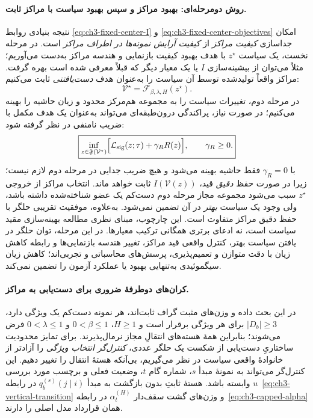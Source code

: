 \paragraph{روش دومرحله‌ای: بهبود مراکز و سپس بهبود سیاست با مراکز ثابت.}
نتیجه بنیادی روابط
\eqref{eq:ch3-fixed-center-I}
و \eqref{eq:ch3-fixed-center-objectives}
امکان جداسازی
\emph{کیفیت مراکز}
از \emph{کیفیت آرایش
نمونه‌ها در اطراف
مراکز} است.
در مرحله نخست،
یک سیاست $z^\star$
با هدف بهبود کیفیت
بازنمایی و هندسه مراکز
به‌دست می‌آوریم؛
مثلاً می‌توان از
بیشینه‌سازی $I$
یا یک معیار دیگر
که قبلاً معرفی شده
است بهره گرفت.
مراکز واقعاً
تولیدشده توسط آن
سیاست را به‌عنوان
هدف \emph{دست‌یافتنی}
ثابت می‌کنیم:
\[
\mathcal V^\star
=\mathcal F_{\beta,\lambda,H}(z^\star).
\]
در مرحله دوم،
تغییرات سیاست را
به مجموعه هم‌مرکز
محدود و زیان حاشیه
را بهینه می‌کنیم؛
در صورت نیاز،
پراکندگی درون‌طبقه‌ای
می‌تواند به‌عنوان
یک هدف مکمل
با ضریب نامنفی
در نظر گرفته شود:
\begin{equation}\label{eq:ch3-two-stage-fixed-center-optimization}
\boxed{
\inf_{z\in\mathfrak F(\mathcal V^\star)}
\Bigl[
\mathcal L_{\mathrm{sig}}(z;\tau)
+\gamma_R R(z)
\Bigr],
\qquad\gamma_R\ge0.
}
\end{equation}
با $\gamma_R=0$
فقط حاشیه بهینه می‌شود
و هیچ ضریب جدایی
در مرحله دوم لازم نیست؛
زیرا در صورت حفظ
\emph{دقیق} قید،
$I(\mathcal V(z))$
ثابت خواهد ماند.
انتخاب مراکز از خروجی
$z^\star$ سبب می‌شود
مجموعه مجاز مرحله دوم
دست‌کم یک عضو شناخته‌شده
داشته باشد، ولی
وجود یک سیاست
\emph{بهتر} در آن
تضمین نمی‌شود.
به‌علاوه، موفقیت
تقریبی حلگر با
حفظ دقیق مراکز
متفاوت است.
این چارچوب، مبنای
نظری مطالعه بهینه‌سازی
مقید سیاست است،
نه ادعای برتری همگانی
ترکیب معیارها. در این مرحله،
توان حلگر در یافتن سیاست بهتر،
کنترل واقعی قید مراکز، تغییر هندسه
بازنمایی‌ها و رابطه کاهش زیان با
دقت متوازن و تعمیم‌پذیری،
پرسش‌های محاسباتی و تجربی‌اند؛
کاهش زیان سیگموئیدی به‌تنهایی
بهبود  یا عملکرد آزمون را تضمین نمی‌کند.

\paragraph{کران‌های دوطرفهٔ ضروری برای دست‌یابی به مراکز.}
در این بحث داده و وزن‌های مثبت گراف ثابت‌اند، هر نمونه دست‌کم یک ویژگی دارد، $|D_b|\ge3$ برای هر ویژگی برقرار است و $H\ge1$، $0<\beta\le1$ و $0<\lambda\le1$ فرض می‌شوند؛ بنابراین همهٔ هسته‌های انتقالِ مجاز نرمال‌پذیرند. برای تمایز محدودیت ساختاریِ دست‌یابی از شکست یک حلگر عددی، \emph{کنترل‌گر انتخاب ویژگی} را آزادتر از خانوادهٔ واقعی سیاست در نظر می‌گیریم، بی‌آنکه هستهٔ انتقال را تغییر دهیم. این کنترل‌گر می‌تواند به نمونهٔ مبدأ $s$، شماره گام $t$، وضعیت فعلی و برچسب مورد بررسی $u$ وابسته باشد. هستهٔ ثابتِ بدون بازگشت به مبدأ $q_b^{(s)}(j\mid i)$ در رابطه~\eqref{eq:ch3-vertical-transition} و وزن‌های گشت سقف‌دار $\alpha_t^{(H)}$ در رابطه~\eqref{eq:ch3-capped-alpha} همان قرارداد مدل اصلی را دارند.

